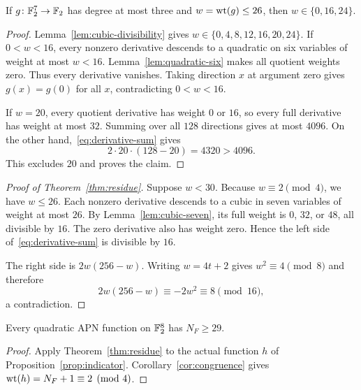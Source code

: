 \begin{lemma}\label{lem:cubic-seven}
If $g\colon\mathbb F_2^7\to\mathbb F_2$ has degree at most three and $w=\operatorname{wt}(g)\le26$, then $w\in\{0,16,24\}$.
\end{lemma}
\begin{proof}
Lemma~\ref{lem:cubic-divisibility} gives
$w\in\{0,4,8,12,16,20,24\}$. If $0<w<16$, every nonzero derivative descends to a quadratic on six variables of weight at most $w<16$. Lemma~\ref{lem:quadratic-six} makes all quotient weights zero. Thus every derivative vanishes. Taking direction $x$ at argument zero gives $g(x)=g(0)$ for all $x$, contradicting $0<w<16$.

If $w=20$, every quotient derivative has weight $0$ or $16$, so every full derivative has weight at most $32$. Summing over all $128$ directions gives at most $4096$. On the other hand,~\eqref{eq:derivative-sum} gives
\[
2\cdot20\cdot(128-20)=4320>4096.
\]
This excludes $20$ and proves the claim.
\end{proof}

\begin{proof}[Proof of Theorem~\ref{thm:residue}]
Suppose $w<30$. Because $w\equiv2\pmod4$, we have $w\le26$. Each nonzero derivative descends to a cubic in seven variables of weight at most $26$. By Lemma~\ref{lem:cubic-seven}, its full weight is $0$, $32$, or $48$, all divisible by $16$. The zero derivative also has weight zero. Hence the left side of~\eqref{eq:derivative-sum} is divisible by $16$.

The right side is $2w(256-w)$. Writing $w=4t+2$ gives $w^2\equiv4\pmod8$ and therefore
\[
2w(256-w)\equiv-2w^2\equiv8\pmod{16},
\]
a contradiction.
\end{proof}

\begin{corollary}\label{cor:preliminary}
Every quadratic APN function on $\mathbb F_2^8$ has $N_F\ge29$.
\end{corollary}
\begin{proof}
Apply Theorem~\ref{thm:residue} to the actual function $h$ of Proposition~\ref{prop:indicator}. Corollary~\ref{cor:congruence} gives $\operatorname{wt}(h)=N_F+1\equiv2\pmod4$.
\end{proof}
